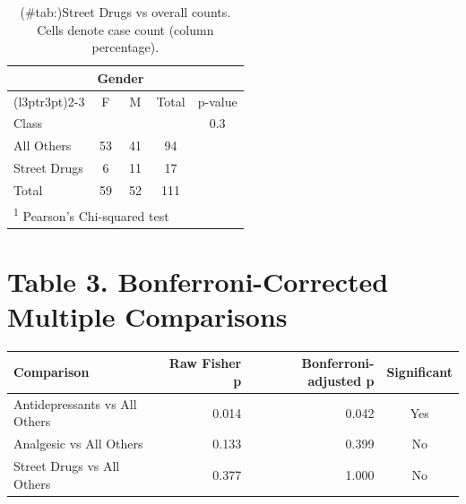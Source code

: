 \documentclass[
]{article}
\begin{document}
\begin{table}

\caption{(\#tab:\label{tab:street-drugs-v-others})Street Drugs vs overall counts. Cells denote case count (column percentage).}
\centering
\begin{tabular}[t]{lcccc}
\toprule
\multicolumn{1}{c}{ } & \multicolumn{2}{c}{Gender} & \multicolumn{2}{c}{ } \\
\cmidrule(l{3pt}r{3pt}){2-3}
 & F & M & Total & p-value\\
\midrule
Class &  &  &  & 0.3\\
\hspace{1em}All Others & 53 & 41 & 94 & \\
\hspace{1em}Street Drugs & 6 & 11 & 17 & \\
Total & 59 & 52 & 111 & \\
\bottomrule
\multicolumn{5}{l}{\rule{0pt}{1em}\textsuperscript{1} Pearson's Chi-squared test}\\
\end{tabular}
\end{table}

\pagebreak

\section{Table 3. Bonferroni-Corrected Multiple Comparisons}\label{table-3.-bonferroni-corrected-multiple-comparisons}

\begin{table}[!h]
\centering
\begin{tabular}{lrrc}
\toprule
\textbf{Comparison} & \textbf{Raw Fisher p} & \textbf{Bonferroni-adjusted p} & \textbf{Significant}\\
\midrule
Antidepressants vs All Others & 0.014 & 0.042 & Yes\\
Analgesic vs All Others & 0.133 & 0.399 & No\\
Street Drugs vs All Others & 0.377 & 1.000 & No\\
\bottomrule
\end{tabular}
\end{table}
\end{document}
